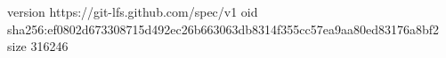 version https://git-lfs.github.com/spec/v1
oid sha256:ef0802d673308715d492ec26b663063db8314f355cc57ea9aa80ed83176a8bf2
size 316246
